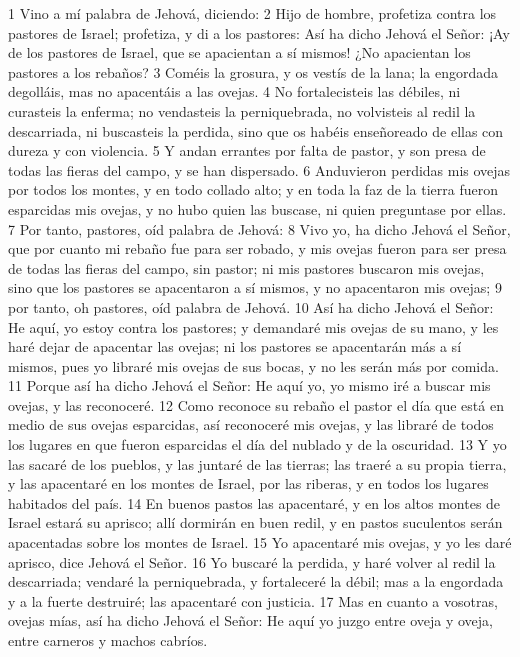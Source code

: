 1 Vino a mí palabra de Jehová, diciendo:
2 Hijo de hombre, profetiza contra los pastores de Israel; profetiza, y di a los pastores: Así ha dicho Jehová el Señor: ¡Ay de los pastores de Israel, que se apacientan a sí mismos! ¿No apacientan los pastores a los rebaños?
3 Coméis la grosura, y os vestís de la lana; la engordada degolláis, mas no apacentáis a las ovejas.
4 No fortalecisteis las débiles, ni curasteis la enferma; no vendasteis la perniquebrada, no volvisteis al redil la descarriada, ni buscasteis la perdida, sino que os habéis enseñoreado de ellas con dureza y con violencia.
5 Y andan errantes por falta de pastor, y son presa de todas las fieras del campo, y se han dispersado.
6 Anduvieron perdidas mis ovejas por todos los montes, y en todo collado alto; y en toda la faz de la tierra fueron esparcidas mis ovejas, y no hubo quien las buscase, ni quien preguntase por ellas.
7 Por tanto, pastores, oíd palabra de Jehová:
8 Vivo yo, ha dicho Jehová el Señor, que por cuanto mi rebaño fue para ser robado, y mis ovejas fueron para ser presa de todas las fieras del campo, sin pastor; ni mis pastores buscaron mis ovejas, sino que los pastores se apacentaron a sí mismos, y no apacentaron mis ovejas;
9 por tanto, oh pastores, oíd palabra de Jehová.
10 Así ha dicho Jehová el Señor: He aquí, yo estoy contra los pastores; y demandaré mis ovejas de su mano, y les haré dejar de apacentar las ovejas; ni los pastores se apacentarán más a sí mismos, pues yo libraré mis ovejas de sus bocas, y no les serán más por comida.
11 Porque así ha dicho Jehová el Señor: He aquí yo, yo mismo iré a buscar mis ovejas, y las reconoceré.
12 Como reconoce su rebaño el pastor el día que está en medio de sus ovejas esparcidas, así reconoceré mis ovejas, y las libraré de todos los lugares en que fueron esparcidas el día del nublado y de la oscuridad.
13 Y yo las sacaré de los pueblos, y las juntaré de las tierras; las traeré a su propia tierra, y las apacentaré en los montes de Israel, por las riberas, y en todos los lugares habitados del país.
14 En buenos pastos las apacentaré, y en los altos montes de Israel estará su aprisco; allí dormirán en buen redil, y en pastos suculentos serán apacentadas sobre los montes de Israel.
15 Yo apacentaré mis ovejas, y yo les daré aprisco, dice Jehová el Señor.
16 Yo buscaré la perdida, y haré volver al redil la descarriada; vendaré la perniquebrada, y fortaleceré la débil; mas a la engordada y a la fuerte destruiré; las apacentaré con justicia.
17 Mas en cuanto a vosotras, ovejas mías, así ha dicho Jehová el Señor: He aquí yo juzgo entre oveja y oveja, entre carneros y machos cabríos.
